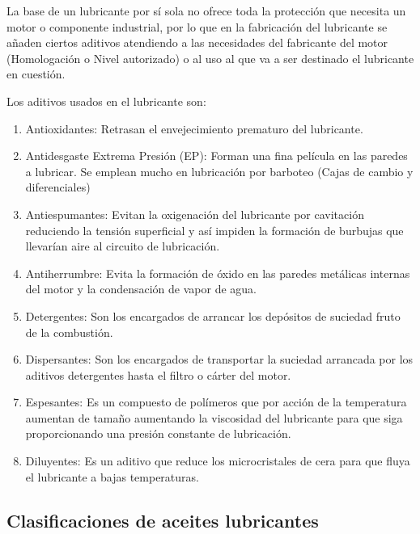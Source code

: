 \documentclass[../main]{subfiles}
\begin{document}
La base de un lubricante por sí sola no ofrece toda la protección que necesita un motor o componente industrial, por lo que en la fabricación del lubricante se añaden ciertos aditivos atendiendo a las necesidades del fabricante del motor (Homologación o Nivel autorizado) o al uso al que va a ser destinado el lubricante en cuestión.

Los aditivos usados en el lubricante son:
\begin{enumerate}
    
\item Antioxidantes: Retrasan el envejecimiento prematuro del lubricante.

\item Antidesgaste Extrema Presión (EP): Forman una fina película en las paredes a lubricar. Se emplean mucho en lubricación por barboteo (Cajas de cambio y diferenciales)

\item Antiespumantes: Evitan la oxigenación del lubricante por cavitación reduciendo la tensión superficial y así impiden la formación de burbujas que llevarían aire al circuito de lubricación.

\item Antiherrumbre: Evita la formación de óxido en las paredes metálicas internas del motor y la condensación de vapor de agua.

\item Detergentes: Son los encargados de arrancar los depósitos de suciedad fruto de la combustión.

\item Dispersantes: Son los encargados de transportar la suciedad arrancada por los aditivos detergentes hasta el filtro o cárter del motor.

\item Espesantes: Es un compuesto de polímeros que por acción de la temperatura aumentan de tamaño aumentando la viscosidad del lubricante para que siga proporcionando una presión constante de lubricación.

\item Diluyentes: Es un aditivo que reduce los microcristales de cera para que fluya el lubricante a bajas temperaturas.
 
\end{enumerate}

\subsection{Clasificaciones de aceites lubricantes}
\end{document}
